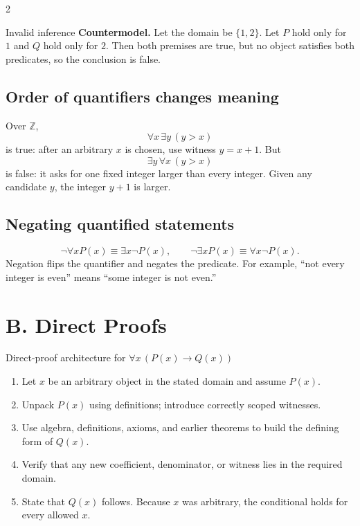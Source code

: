 \documentclass[10pt]{article}
\newcommand{\Z}{\mathbb Z}
\begin{document}
\begin{multicols}{2}
\begin{warningbox}{Invalid inference}
\textbf{Countermodel.} Let the domain be $\{1,2\}$. Let $P$ hold only for $1$
and $Q$ hold only for $2$. Then both premises are true, but no object satisfies
both predicates, so the conclusion is false.
\end{warningbox}

\subsection*{Order of quantifiers changes meaning}

Over $\Z$,
\[
\forall x\,\exists y\,(y>x)
\]
is true: after an arbitrary $x$ is chosen, use witness $y=x+1$.
But
\[
\exists y\,\forall x\,(y>x)
\]
is false: it asks for one fixed integer larger than every integer. Given any
candidate $y$, the integer $y+1$ is larger.

\subsection*{Negating quantified statements}
\[
\neg\forall xP(x)\equiv\exists x\neg P(x),\qquad
\neg\exists xP(x)\equiv\forall x\neg P(x).
\]
Negation flips the quantifier and negates the predicate. For example, ``not
every integer is even'' means ``some integer is not even.''
\end{multicols}

\clearpage
\section*{B. Direct Proofs}

\begin{methodbox}{Direct-proof architecture for $\forall x\,(P(x)\to Q(x))$}
\begin{enumerate}
  \item Let $x$ be an arbitrary object in the stated domain and assume $P(x)$.
  \item Unpack $P(x)$ using definitions; introduce correctly scoped witnesses.
  \item Use algebra, definitions, axioms, and earlier theorems to build the
        defining form of $Q(x)$.
  \item Verify that any new coefficient, denominator, or witness lies in the
        required domain.
  \item State that $Q(x)$ follows. Because $x$ was arbitrary, the conditional
        holds for every allowed $x$.
\end{enumerate}
\end{methodbox}
\end{document}
